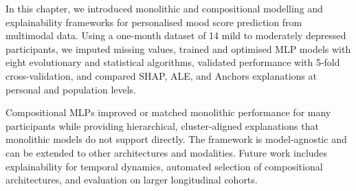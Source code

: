 In this chapter, we introduced monolithic and compositional modelling and explainability frameworks for personalised mood score prediction from multimodal data. Using a one-month dataset of 14 mild to moderately depressed participants, we imputed missing values, trained and optimised MLP models with eight evolutionary and statistical algorithms, validated performance with 5-fold cross-validation, and compared SHAP, ALE, and Anchors explanations at personal and population levels.

Compositional MLPs improved or matched monolithic performance for many participants while providing hierarchical, cluster-aligned explanations that monolithic models do not support directly. The framework is model-agnostic and can be extended to other architectures and modalities. Future work includes explainability for temporal dynamics, automated selection of compositional architectures, and evaluation on larger longitudinal cohorts.









